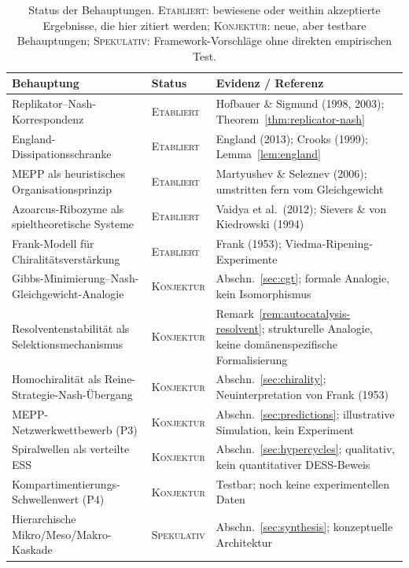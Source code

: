 \documentclass[12pt,a4paper]{article}
\theoremstyle{remark}
\begin{document}
\begin{table}[htbp]
\centering
\caption{Status der Behauptungen. \textsc{Etabliert}: bewiesene oder weithin akzeptierte Ergebnisse, die hier zitiert werden; \textsc{Konjektur}: neue, aber testbare Behauptungen; \textsc{Spekulativ}: Framework-Vorschl\"age ohne direkten empirischen Test.}
\label{tab:status-claims}
\small
\begin{tabular}{p{4.8cm}lp{5.2cm}}
\toprule
\textbf{Behauptung} & \textbf{Status} & \textbf{Evidenz / Referenz} \\
\midrule
Replikator--Nash-Korrespondenz & \textsc{Etabliert} & Hofbauer \& Sigmund (1998, 2003); Theorem~\ref{thm:replicator-nash} \\
England-Dissipationsschranke & \textsc{Etabliert} & England (2013); Crooks (1999); Lemma~\ref{lem:england} \\
MEPP als heuristisches Organisationsprinzip & \textsc{Etabliert} & Martyushev \& Seleznev (2006); umstritten fern vom Gleichgewicht \\
Azoarcus-Ribozyme als spieltheoretische Systeme & \textsc{Etabliert} & Vaidya et al.\ (2012); Sievers \& von Kiedrowski (1994) \\
Frank-Modell f\"ur Chiralit\"atsverst\"arkung & \textsc{Etabliert} & Frank (1953); Viedma-Ripening-Experimente \\
Gibbs-Minimierung--Nash-Gleichgewicht-Analogie & \textsc{Konjektur} & Abschn.~\ref{sec:cgt}; formale Analogie, kein Isomorphismus \\
Resolventenstabilit\"at als Selektionsmechanismus & \textsc{Konjektur} & Remark~\ref{rem:autocatalysis-resolvent}; strukturelle Analogie, keine dom\"anenspezifische Formalisierung \\
Homochiralit\"at als Reine-Strategie-Nash-\"Ubergang & \textsc{Konjektur} & Abschn.~\ref{sec:chirality}; Neuinterpretation von Frank (1953) \\
MEPP-Netzwerkwettbewerb (P3) & \textsc{Konjektur} & Abschn.~\ref{sec:predictions}; illustrative Simulation, kein Experiment \\
Spiralwellen als verteilte ESS & \textsc{Konjektur} & Abschn.~\ref{sec:hypercycles}; qualitativ, kein quantitativer DESS-Beweis \\
Kompartimentierungs-Schwellenwert (P4) & \textsc{Konjektur} & Testbar; noch keine experimentellen Daten \\
Hierarchische Mikro/Meso/Makro-Kaskade & \textsc{Spekulativ} & Abschn.~\ref{sec:synthesis}; konzeptuelle Architektur \\
\bottomrule
\end{tabular}
\end{table}
\end{document}
